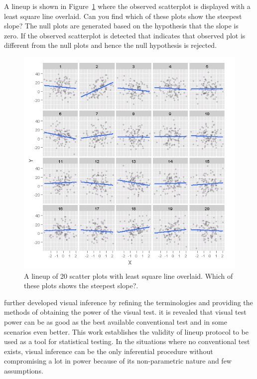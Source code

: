 \documentclass[11pt]{article}
\begin{document}
A lineup is shown in Figure~\ref{fig:lineup_turk} where the observed scatterplot is displayed with a least square line overlaid. Can you find which of these plots show the steepest slope? The null plots are generated based on the hypothesis that the slope is zero. If the observed scatterplot is detected that indicates that observed plot is different from the null plots and hence the null hypothesis is rejected.

\begin{figure}[htbp] 
   \centering
   \includegraphics[width=6.5in]{plot_turk2_100_450_12_3.png} 
   \caption{A lineup of 20 scatter plots with least square line overlaid. Which of these plots shows the steepest slope?.}
   \label{fig:lineup_turk}
\end{figure}


\cite{majumder:2013}  further developed visual inference by refining the terminologies and providing the methods of obtaining the power of the visual test. it is revealed that visual test power can be as good as the best available conventional test and in some scenarios even better. This work establishes the validity of lineup protocol to be used as a tool for statistical testing. In the situations where no conventional test exists, visual inference can be the only inferential procedure without compromising a lot in power because of its non-parametric nature and few assumptions. 
\end{document}
